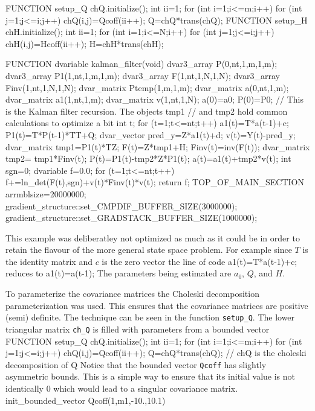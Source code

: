 FUNCTION setup_Q
  chQ.initialize();
  int ii=1;
  for (int i=1;i<=m;i++)
    for (int j=1;j<=i;j++)
      chQ(i,j)=Qcoff(ii++);
  Q=chQ*trans(chQ);    
FUNCTION setup_H
  chH.initialize();
  int ii=1;
  for (int i=1;i<=N;i++)
    for (int j=1;j<=i;j++)
      chH(i,j)=Hcoff(ii++);
  H=chH*trans(chH);    

FUNCTION dvariable kalman_filter(void)  
  dvar3_array P(0,nt,1,m,1,m);
  dvar3_array P1(1,nt,1,m,1,m);
  dvar3_array F(1,nt,1,N,1,N);
  dvar3_array Finv(1,nt,1,N,1,N);
  dvar_matrix Ptemp(1,m,1,m);
  dvar_matrix a(0,nt,1,m);
  dvar_matrix a1(1,nt,1,m);
  dvar_matrix v(1,nt,1,N);
  a(0)=a0;
  P(0)=P0;
  // This is the Kalman filter recursion. The objects tmp1
  // and tmp2 hold common calculations to optimize a bit
  int t;
  for (t=1;t<=nt;t++)
  {
    a1(t)=T*a(t-1)+c;
    P1(t)=T*P(t-1)*TT+Q;
    dvar_vector pred_y=Z*a1(t)+d;
    v(t)=Y(t)-pred_y;
    dvar_matrix tmp1=P1(t)*TZ;
    F(t)=Z*tmp1+H;
    Finv(t)=inv(F(t));
    dvar_matrix tmp2= tmp1*Finv(t);
    P(t)=P1(t)-tmp2*Z*P1(t);
    a(t)=a1(t)+tmp2*v(t);
  }
  int sgn=0;
  dvariable f=0.0;
  for (t=1;t<=nt;t++)
    f+=ln_det(F(t),sgn)+v(t)*Finv(t)*v(t);
  return f;  
TOP_OF_MAIN_SECTION
  arrmblsize=20000000;
  gradient_structure::set_CMPDIF_BUFFER_SIZE(3000000);
  gradient_structure::set_GRADSTACK_BUFFER_SIZE(1000000);
 
\endexample 
This example was deliberatley not optimized as much as it could be
in order to retain the flavour of the more general state space
problem. For example since $T$ is the identity matrix and $c$ is the
zero vector the line of code 
\beginexample
    a1(t)=T*a(t-1)+c;
\endexample 
reduces to
\beginexample
    a1(t)=a(t-1);
\endexample 
The parameters being estimated are  $a_0$, $Q$, and $H$. 

To parameterize the covariance matrices the Choleski decomposition
parameterization was used. This ensures that the covariance matrices are
positive (semi) definite. The technique can be seen in the function
{\tt setup\_Q}. 
The lower triangular matrix {\tt ch\_Q} is filled with parameters
from a bounded vector
\beginexample
FUNCTION setup_Q
  chQ.initialize();
  int ii=1;
  for (int i=1;i<=m;i++)
    for (int j=1;j<=i;j++)
      chQ(i,j)=Qcoff(ii++);
  Q=chQ*trans(chQ);   // chQ is the choleski decomposition of Q 
\endexample
Notice that the bounded vector {\tt Qcoff} has slightly asymmetric
bounds. This is a simple way to ensure that its initial value is not
identically 0 which would lead to a singular covariance matrix.
\beginexample
  init_bounded_vector Qcoff(1,m1,-10.,10.1)
\endexample


